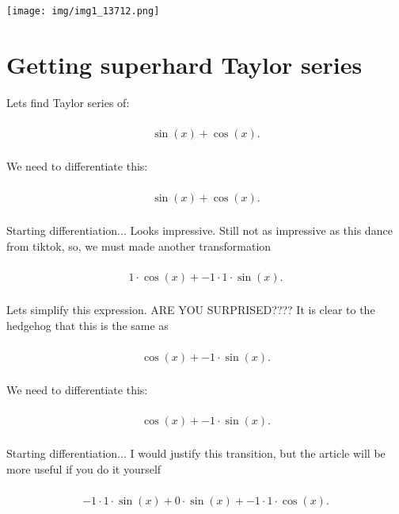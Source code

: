 \documentclass[12pt,a4paper]{extreport}
\begin{document}
\texttt{[image: img/img1\_13712.png]}
\section{Getting superhard Taylor series}

Lets find Taylor series of:


\begin{multline}
\\
\sin(x) + \cos(x).\\
\end{multline}


We need to differentiate this:


\begin{multline}
\\
\sin(x) + \cos(x).\\
\end{multline}


Starting differentiation... 
Looks impressive. Still not as impressive as this dance from tiktok\cite{Zolo}, so, we must made another transformation 

\begin{multline}
\\
1 \cdot \cos(x) + -1 \cdot 1 \cdot \sin(x).\\
\end{multline}


Lets simplify this expression.
ARE YOU SURPRISED????\cite{Dashkov} It is clear to the hedgehog that this is the same as 

\begin{multline}
\\
\cos(x) + -1 \cdot \sin(x).\\
\end{multline}


We need to differentiate this:


\begin{multline}
\\
\cos(x) + -1 \cdot \sin(x).\\
\end{multline}


Starting differentiation... 
I would justify this transition, but the article will be more useful if you do it yourself 

\begin{multline}
\\
-1 \cdot 1 \cdot \sin(x) + 0 \cdot \sin(x) + -1 \cdot 1 \cdot \cos(x).\\
\end{multline}
\end{document}
